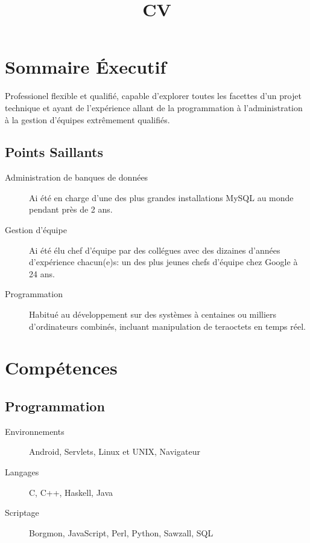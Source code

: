 \documentclass[10pt,letter,sans]{moderncv}   %
\title{CV}
\begin{document}
\makecvtitle

\section{Sommaire \'{E}xecutif}
Professionel flexible et qualifi\'{e}, capable d'explorer toutes les facettes d'un projet technique et ayant de l'exp\'{e}rience allant de la programmation \`{a} l'administration \`{a} la gestion d'\'{e}quipes extr\^{e}mement qualifi\'{e}s.

\subsection{Points Saillants}
\begin{description}
\item[Administration de banques de donn\'{e}es] Ai \'{e}t\'{e} en charge d'une des plus grandes installations MySQL au monde pendant pr\`{e}s de 2 ans.

\vspace{2 mm}

\item[Gestion d'\'{e}quipe] Ai \'{e}t\'{e} \'{e}lu chef d'\'{e}quipe par des coll\'{e}gues avec des dizaines d'ann\'{e}es d'exp\'{e}rience chacun(e)s: un des plus jeunes chefs d'\'{e}quipe chez Google \`{a} 24 ans.

\vspace{2 mm}

\item[Programmation] Habitu\'{e} au d\'{e}veloppement sur des syst\`{e}mes \`{a} centaines ou milliers d'ordinateurs combin\'{e}s, incluant manipulation de teraoctets en temps r\'{e}el.
\end{description}

\section{Comp\'{e}tences}
\subsection{Programmation}
\begin{description}
\item[Environnements] Android, Servlets, Linux et UNIX, Navigateur

\vspace{2 mm}

\item[Langages] C, C++, Haskell, Java

\vspace{2 mm}

\item[Scriptage] Borgmon, JavaScript, Perl, Python, Sawzall, SQL
\end{description}
\end{document}
